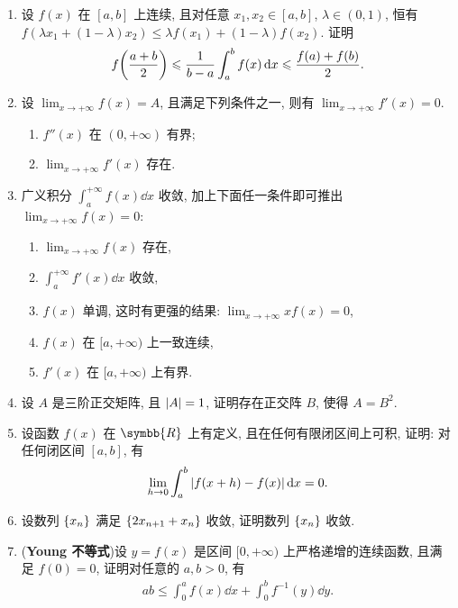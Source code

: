 \documentclass{ctexart}
\let\set\qty
\let\emph\textbf
\let\le\leqslant
\newcommand{\limit}[2]{\lim_{#1 \to #2}}
\newcommand{\R}{\ensuremath{\symbb{R}}}
\begin{document}
\begin{enumerate}[series=exer]
    \item 设 $ f(x) $ 在 $ [a, b] $ 上连续, 且对任意 $ x_{1}, x_{2} \in [a, b] $, $ \lambda \in (0, 1) $, 恒有 $ f(\lambda x_{1} + (1-\lambda) x_{2}) \le \lambda f(x_{1}) + (1 - \lambda) f(x_{2}) $. 证明
    \begin{align*}
        f\qty(\frac{a+b}{2}) \le \frac{1}{b - a}\int_{a}^{b} f(x) \dd{x} \le \frac{f(a) + f(b)}{2}.
    \end{align*}
    \item 设 $ \limit{x}{+\infty} f(x) = A $, 且满足下列条件之一, 则有 $ \limit{x}{+\infty} f'(x) = 0 $.
    \begin{enumerate}
        \item $ f''(x) $ 在 $ (0, +\infty) $ 有界;
        \item $ \limit{x}{+\infty} f'(x) $ 存在.
    \end{enumerate}
    \item 广义积分 $ \int_{a}^{+\infty} f(x) \dd{x} $ 收敛, 加上下面任一条件即可推出 $ \limit{x}{+\infty} f(x) = 0 $:
    \begin{enumerate}
        \item $ \limit{x}{+\infty} f(x) $ 存在,
        \item $ \int_{a}^{+\infty} f'(x) \dd{x} $ 收敛,
        \item $ f(x) $ 单调, 这时有更强的结果: $ \limit{x}{+\infty} xf(x) = 0 $,
        \item $ f(x) $ 在 $ [a, +\infty) $ 上一致连续,
        \item $ f'(x) $ 在 $ [a, +\infty) $ 上有界. 
    \end{enumerate}
    \item 设 $ A $ 是三阶正交矩阵, 且 $ \abs{A} = 1 $, 证明存在正交阵 $ B $, 使得 $ A = B^{2} $.  
    \item 设函数 $ f(x) $ 在 $ \R $ 上有定义, 且在任何有限闭区间上可积, 证明: 对任何闭区间 $ [a, b] $, 有
    \begin{align*}
        \limit{h}{0} \int_{a}^{b} \abs{f(x + h) - f(x)} \dd{x} = 0.
    \end{align*}
    \item 设数列 $ \set{x_{n}} $ 满足 $ \set{2x_{n+1} + x_{n}} $ 收敛, 证明数列 $ \set{x_{n}} $ 收敛. 
    \item (\emph{Young 不等式})设 $ y=f(x) $ 是区间 $ [0, +\infty) $ 上严格递增的连续函数, 且满足 $ f(0) = 0 $, 证明对任意的 $ a, b > 0 $, 有
    \begin{align*}
        ab \le \int_{0}^{a}f(x) \dd{x} + \int_{0}^{b} f^{-1}(y) \dd{y}.

\end{align*}
\end{enumerate}
\end{document}
